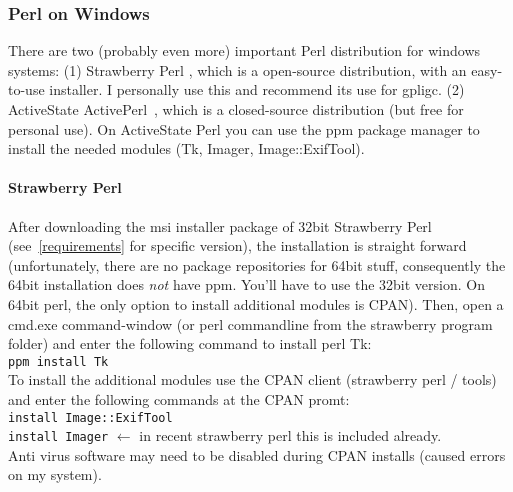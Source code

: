 \subsubsection{Perl on Windows}
\label{perl}
There are two (probably even more) important Perl distribution for windows systems:
(1) Strawberry Perl \cite{strawberryperl}, which is a open-source distribution, with an easy-to-use installer.
I personally use this and recommend its use for gpligc.
(2) ActiveState ActivePerl~\cite{activeperl}, which is a closed-source distribution (but free for personal use).
On ActiveState Perl you can use the ppm package manager to install the needed modules (Tk, Imager, Image::ExifTool).

\paragraph{Strawberry Perl}
After downloading the msi installer package of 32bit Strawberry Perl (see~\ref{requirements} for specific version),
the installation is straight forward (unfortunately, there are no package repositories for 64bit stuff, consequently the 64bit installation does \emph{not} have ppm. You'll have to use the 32bit version. On 64bit perl, the only option to install additional modules is CPAN).
Then, open a cmd.exe command-window (or perl commandline from the strawberry program folder) and enter the following
command to install perl Tk:\\
\texttt{ppm install Tk}\\
To install the additional modules use the CPAN client (strawberry perl / tools) and enter the following commands
at the CPAN promt:\\
\texttt{install Image::ExifTool}\\
\texttt{install Imager}  $\leftarrow$ in recent strawberry perl this is included already.\\
Anti virus software may need to be disabled during CPAN installs (caused errors on my system).



